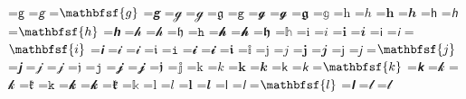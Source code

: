 \documentclass{article}
\begin{document}
=\hbox{$\mathsf{g}$}
=\hbox{$\mathsfit{g}$}
=\hbox{$\mathbfsf{g}$}
=\hbox{$\mathbfsfit{g}$}
=\hbox{$\mathcal{g}$}
=\hbox{$\mathscr{g}$}
=\hbox{$\mathfrak{g}$}
=\hbox{$\mathtt{g}$}
=\hbox{$\mathbfcal{g}$}
=\hbox{$\mathbfscr{g}$}
=\hbox{$\mathbffrak{g}$}
=\hbox{$\mathbb{g}$}
=\hbox{$\mathrm{h}$}
=\hbox{$\mathit{h}$}
=\hbox{$\mathbf{h}$}
=\hbox{$\mathbfit{h}$}
=\hbox{$\mathsf{h}$}
=\hbox{$\mathsfit{h}$}
=\hbox{$\mathbfsf{h}$}
=\hbox{$\mathbfsfit{h}$}
=\hbox{$\mathcal{h}$}
=\hbox{$\mathscr{h}$}
=\hbox{$\mathfrak{h}$}
=\hbox{$\mathtt{h}$}
=\hbox{$\mathbfcal{h}$}
=\hbox{$\mathbfscr{h}$}
=\hbox{$\mathbffrak{h}$}
=\hbox{$\mathbb{h}$}
=\hbox{$\mathrm{i}$}
=\hbox{$\mathit{i}$}
=\hbox{$\mathbf{i}$}
=\hbox{$\mathbfit{i}$}
=\hbox{$\mathsf{i}$}
=\hbox{$\mathsfit{i}$}
=\hbox{$\mathbfsf{i}$}
=\hbox{$\mathbfsfit{i}$}
=\hbox{$\mathcal{i}$}
=\hbox{$\mathscr{i}$}
=\hbox{$\mathfrak{i}$}
=\hbox{$\mathtt{i}$}
=\hbox{$\mathbfcal{i}$}
=\hbox{$\mathbfscr{i}$}
=\hbox{$\mathbffrak{i}$}
=\hbox{$\mathbb{i}$}
=\hbox{$\mathrm{j}$}
=\hbox{$\mathit{j}$}
=\hbox{$\mathbf{j}$}
=\hbox{$\mathbfit{j}$}
=\hbox{$\mathsf{j}$}
=\hbox{$\mathsfit{j}$}
=\hbox{$\mathbfsf{j}$}
=\hbox{$\mathbfsfit{j}$}
=\hbox{$\mathcal{j}$}
=\hbox{$\mathscr{j}$}
=\hbox{$\mathfrak{j}$}
=\hbox{$\mathtt{j}$}
=\hbox{$\mathbfcal{j}$}
=\hbox{$\mathbfscr{j}$}
=\hbox{$\mathbffrak{j}$}
=\hbox{$\mathbb{j}$}
=\hbox{$\mathrm{k}$}
=\hbox{$\mathit{k}$}
=\hbox{$\mathbf{k}$}
=\hbox{$\mathbfit{k}$}
=\hbox{$\mathsf{k}$}
=\hbox{$\mathsfit{k}$}
=\hbox{$\mathbfsf{k}$}
=\hbox{$\mathbfsfit{k}$}
=\hbox{$\mathcal{k}$}
=\hbox{$\mathscr{k}$}
=\hbox{$\mathfrak{k}$}
=\hbox{$\mathtt{k}$}
=\hbox{$\mathbfcal{k}$}
=\hbox{$\mathbfscr{k}$}
=\hbox{$\mathbffrak{k}$}
=\hbox{$\mathbb{k}$}
=\hbox{$\mathrm{l}$}
=\hbox{$\mathit{l}$}
=\hbox{$\mathbf{l}$}
=\hbox{$\mathbfit{l}$}
=\hbox{$\mathsf{l}$}
=\hbox{$\mathsfit{l}$}
=\hbox{$\mathbfsf{l}$}
=\hbox{$\mathbfsfit{l}$}
=\hbox{$\mathcal{l}$}
=\hbox{$\mathscr{l}$}
\end{document}
